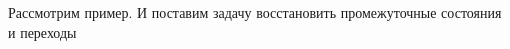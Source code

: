 \begin{frame}
\frametitle{\insertsection} 
\framesubtitle{\insertsubsection}
Рассмотрим пример. И поставим задачу восстановить промежуточные состояния и переходы
\inputminted{java}{code/StreamWithoutPeeks.java}
\end{frame}
